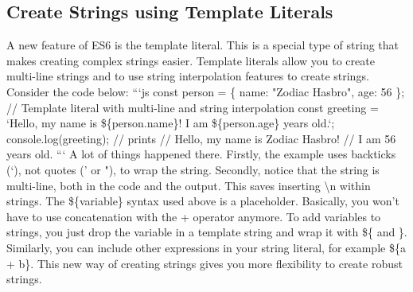 \documentclass{article}%
\begin{document}
\subsection{Create Strings using Template Literals}%
\label{subsec:CreateStringsusingTemplateLiterals}%
A new feature of ES6 is the template literal. This is a special type of string that makes creating complex strings easier.\newline%
Template literals allow you to create multi{-}line strings and to use string interpolation features to create strings.\newline%
Consider the code below:\newline%
```js\newline%
const person = \{\newline%
  name: "Zodiac Hasbro",\newline%
  age: 56\newline%
\};\newline%
// Template literal with multi{-}line and string interpolation\newline%
const greeting = `Hello, my name is \$\{person.name\}!\newline%
I am \$\{person.age\} years old.`;\newline%
console.log(greeting); // prints\newline%
// Hello, my name is Zodiac Hasbro!\newline%
// I am 56 years old.\newline%
```\newline%
A lot of things happened there.\newline%
Firstly, the example uses backticks (`), not quotes (' or "), to wrap the string.\newline%
Secondly, notice that the string is multi{-}line, both in the code and the output. This saves inserting \textbackslash{}n within strings.\newline%
The \$\{variable\} syntax used above is a placeholder. Basically, you won't have to use concatenation with the + operator anymore. To add variables to strings, you just drop the variable in a template string and wrap it with \$\{ and \}. Similarly, you can include other expressions in your string literal, for example \$\{a + b\}.\newline%
This new way of creating strings gives you more flexibility to create robust strings.\newline%

%
\end{document}
